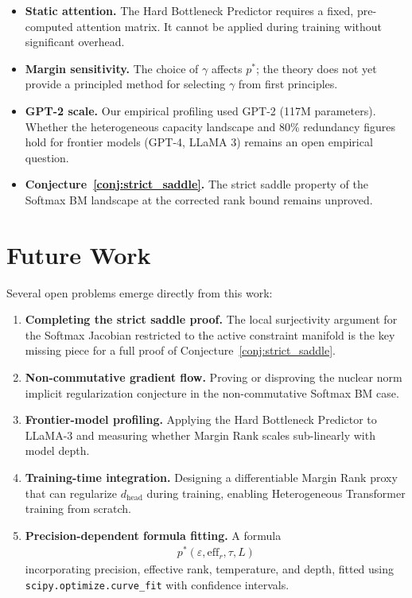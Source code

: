 \begin{itemize}
  \item \textbf{Static attention.} The Hard Bottleneck Predictor requires a fixed,
        pre-computed attention matrix. It cannot be applied during training without
        significant overhead.
  \item \textbf{Margin sensitivity.} The choice of $\gamma$ affects $p^*$; the theory does
        not yet provide a principled method for selecting $\gamma$ from first principles.
  \item \textbf{GPT-2 scale.} Our empirical profiling used GPT-2 (117M parameters). Whether
        the heterogeneous capacity landscape and 80\% redundancy figures hold for frontier
        models (GPT-4, LLaMA 3) remains an open empirical question.
  \item \textbf{Conjecture~\ref{conj:strict_saddle}.} The strict saddle property of the
        Softmax BM landscape at the corrected rank bound remains unproved.
\end{itemize}

\section{Future Work}
\label{sec:future}

Several open problems emerge directly from this work:

\begin{enumerate}
  \item \textbf{Completing the strict saddle proof.} The local surjectivity argument for the
        Softmax Jacobian restricted to the active constraint manifold is the key missing piece
        for a full proof of Conjecture~\ref{conj:strict_saddle}.
  \item \textbf{Non-commutative gradient flow.} Proving or disproving the nuclear norm
        implicit regularization conjecture in the non-commutative Softmax BM case.
  \item \textbf{Frontier-model profiling.} Applying the Hard Bottleneck Predictor to LLaMA-3
        and measuring whether Margin Rank scales sub-linearly with model depth.
  \item \textbf{Training-time integration.} Designing a differentiable Margin Rank proxy
        that can regularize $d_{\text{head}}$ during training, enabling Heterogeneous
        Transformer training from scratch.
  \item \textbf{Precision-dependent formula fitting.} A formula
        \begin{equation}
        \begin{aligned}
            p^*(\varepsilon, \text{eff}_r, \tau, L)
        \end{aligned}
        \end{equation}
        incorporating precision, effective rank, temperature, and
        depth, fitted using \texttt{scipy.optimize.curve\_fit} with confidence intervals.
\end{enumerate}

